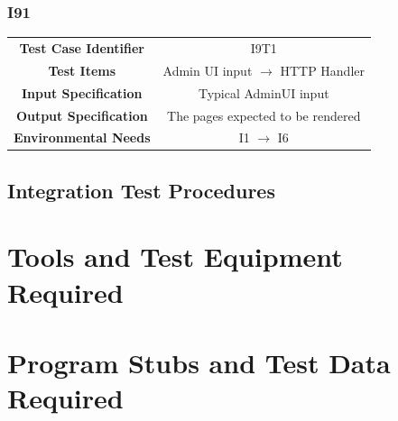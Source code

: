 \documentclass{article}
\begin{document}
\subsubsection{I91}
\begin{adjustbox}{width=1.2\textwidth}	
	\begin{tabular}{*{2}{c}}
		\midrule
		\textbf{Test Case Identifier} & I9T1\\
		\textbf{Test Items} & Admin UI input $\rightarrow$ HTTP Handler\\
		\textbf{Input Specification} & Typical AdminUI input\\
		\textbf{Output Specification} & The pages expected to be rendered\\
		\textbf{Environmental Needs} & I1 $\rightarrow$ I6\\
		\bottomrule
	\end{tabular}
\end{adjustbox}
\subsection{Integration Test Procedures}
\section{Tools and Test Equipment Required}
\section{Program Stubs and Test Data Required}
\end{document}
